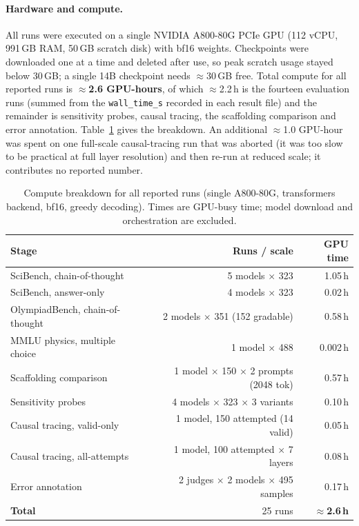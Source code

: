 \paragraph{Hardware and compute.}
All runs were executed on a single NVIDIA A800-80G PCIe GPU (112 vCPU,
991\,GB RAM, 50\,GB scratch disk) with bf16 weights. Checkpoints were downloaded
one at a time and deleted after use, so peak scratch usage stayed below 30\,GB;
a single 14B checkpoint needs $\approx$30\,GB free. Total compute for all
reported runs is \textbf{$\approx$2.6 GPU-hours}, of which $\approx$2.2\,h is
the fourteen evaluation runs (summed from the \texttt{wall\_time\_s} recorded in
each result file) and the remainder is sensitivity probes, causal tracing,
the scaffolding comparison and error annotation.
Table~\ref{tab:compute} gives the breakdown. An additional
$\approx$1.0 GPU-hour was spent on one full-scale causal-tracing run that was
aborted (it was too slow to be practical at full layer resolution) and then
re-run at reduced scale; it contributes no reported number.

\begin{table}[t]
  \centering
  \caption{Compute breakdown for all reported runs (single A800-80G,
           transformers backend, bf16, greedy decoding). Times are GPU-busy
           time; model download and orchestration are excluded.}
  \label{tab:compute}
  \small
  \begin{tabular}{@{}l r r@{}}
    \toprule
    \textbf{Stage} & \textbf{Runs / scale} & \textbf{GPU time} \\
    \midrule
    SciBench, chain-of-thought        & 5 models $\times$ 323 & 1.05\,h \\
    SciBench, answer-only             & 4 models $\times$ 323 & 0.02\,h \\
    OlympiadBench, chain-of-thought   & 2 models $\times$ 351 (152 gradable) & 0.58\,h \\
    MMLU physics, multiple choice     & 1 model $\times$ 488  & 0.002\,h \\
    Scaffolding comparison            & 1 model $\times$ 150 $\times$ 2 prompts (2048 tok) & 0.57\,h \\
    Sensitivity probes                & 4 models $\times$ 323 $\times$ 3 variants & 0.10\,h \\
    Causal tracing, valid-only        & 1 model, 150 attempted (14 valid) & 0.05\,h \\
    Causal tracing, all-attempts      & 1 model, 100 attempted $\times$ 7 layers & 0.08\,h \\
    Error annotation                  & 2 judges $\times$ 2 models $\times$ 495 samples & 0.17\,h \\
    \midrule
    \textbf{Total}                    & 25 runs & \textbf{$\approx$2.6\,h} \\
    \bottomrule
  \end{tabular}
\end{table}

